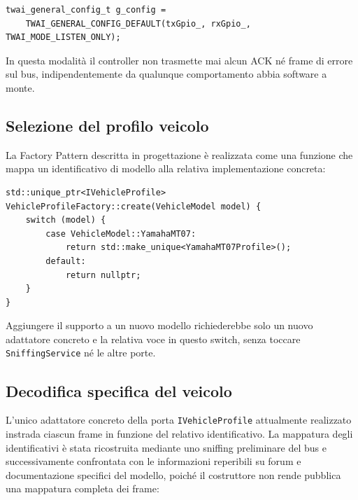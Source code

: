 \begin{listing}[H]
\begin{verbatim}
twai_general_config_t g_config =
    TWAI_GENERAL_CONFIG_DEFAULT(txGpio_, rxGpio_, TWAI_MODE_LISTEN_ONLY);
\end{verbatim}
\caption{Configurazione del controller TWAI in modalità listen-only}
\label{listing:twai-listen-only}
\end{listing}

In questa modalità il controller non trasmette mai alcun ACK né frame di
errore sul bus, indipendentemente da qualunque comportamento abbia software a
monte.

\subsection{Selezione del profilo veicolo}
La Factory Pattern descritta in progettazione è realizzata come una funzione 
che mappa un identificativo di modello alla relativa implementazione
concreta:

\begin{listing}[H]
\begin{verbatim}
std::unique_ptr<IVehicleProfile> VehicleProfileFactory::create(VehicleModel model) {
    switch (model) {
        case VehicleModel::YamahaMT07:
            return std::make_unique<YamahaMT07Profile>();
        default:
            return nullptr;
    }
}
\end{verbatim}
\caption{Selezione del profilo veicolo tramite Factory Pattern}
\label{listing:vehicle-factory}
\end{listing}

Aggiungere il supporto a un nuovo modello richiederebbe solo un nuovo
adattatore concreto e la relativa voce in questo switch, senza toccare
\texttt{SniffingService} né le altre porte.

\subsection{Decodifica specifica del veicolo}
L’unico adattatore concreto della porta \texttt{IVehicleProfile} attualmente
realizzato instrada ciascun frame in funzione del relativo identificativo.
La mappatura degli identificativi è stata ricostruita mediante uno
sniffing preliminare del bus e successivamente confrontata con le
informazioni reperibili su forum e documentazione specifici del modello,
poiché il costruttore non rende pubblica una mappatura completa dei frame:

